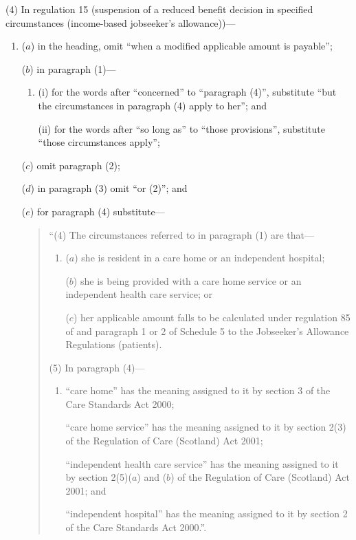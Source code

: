 \documentclass[12pt,a4paper]{article}
\begin{document}
(4) In regulation 15 (suspension of a reduced benefit decision in specified circumstances (income-based jobseeker’s allowance))—
\begin{enumerate}\item[]
($a$) in the heading, omit “when a modified applicable amount is payable”;

($b$) in paragraph (1)—
\begin{enumerate}\item[]
(i) for the words after “concerned” to “paragraph (4)”, substitute “but the circumstances in paragraph (4) apply to her”; and

(ii) for the words after “so long as” to “those provisions”, substitute “those circumstances apply”;
\end{enumerate}

($c$) omit paragraph (2);

($d$) in paragraph (3) omit “or (2)”; and

($e$) for paragraph (4) substitute—
\begin{quotation}
“(4) The circumstances referred to in paragraph (1) are that—
\begin{enumerate}\item[]
($a$) she is resident in a care home or an independent hospital;

($b$) she is being provided with a care home service or an independent health care service; or

($c$) her applicable amount falls to be calculated under regulation 85 of and paragraph 1 or 2 of Schedule 5 to the Jobseeker’s Allowance Regulations (patients).
\end{enumerate}

(5) In paragraph (4)—
\begin{enumerate}\item[]
“care home” has the meaning assigned to it by section 3 of the Care Standards Act 2000;

“care home service” has the meaning assigned to it by section 2(3) of the Regulation of Care (Scotland) Act 2001;

“independent health care service” has the meaning assigned to it by section 2(5)($a$)  and ($b$)  of the Regulation of Care (Scotland) Act 2001; and

“independent hospital” has the meaning assigned to it by section 2 of the Care Standards Act 2000.”.
\end{enumerate}
\end{quotation}
\end{enumerate}
\end{document}
